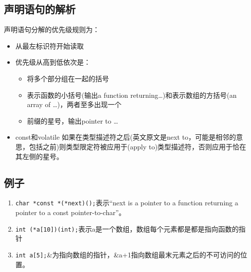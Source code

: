 \subsection{声明语句的解析}
声明语句分解的优先级规则为：
\begin{itemize}
    \item 从最左标识符开始读取
    \item 优先级从高到低依次是： 
        \begin{itemize}
            \item 将多个部分组在一起的括号 
            \item 表示函数的小括号(输出a function returning\dots)和表示数组的方括号(an array of \dots)，两者至多出现一个 
            \item 前缀的星号，输出pointer to \dots
        \end{itemize}
    \item const和volatile 如果在类型描述符之后(英文原文是next to，可能是相邻的意思，包括之前)则类型限定符被应用于(apply to)类型描述符，否则应用于恰在其左侧的星号。 
\end{itemize}

\subsection{例子}
\begin{enumerate}
    \item \verb|char *const *(*next)();|表示``next is a pointer to a function returning a pointer to a const pointer-to-char''。
    \item \verb|int (*a[10])(int);|表示a是一个数组，数组每个元素都是都是指向函数的指针
    \item \verb|int a[5];|\&为指向数组的指针，\&a+1指向数组最末元素之后的不可访问的位置。
\end{enumerate}
















